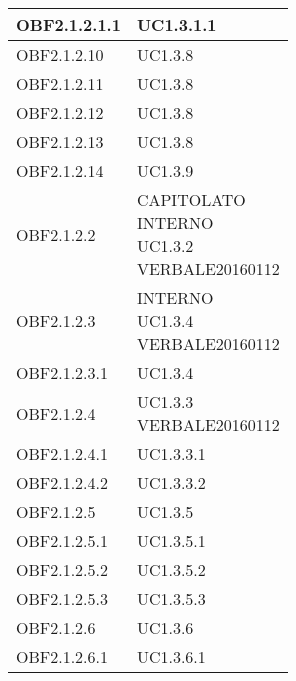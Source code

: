 \documentclass{scalatekids-article}
\begin{document}
\begin{longtable}[H]{|p{5.5cm}|p{5.5cm}|}
\hline
OBF2.1.2.1.1 & \multiLineCell[t]{UC1.3.1.1\\}\\
\hline
OBF2.1.2.10 & \multiLineCell[t]{UC1.3.8\\}\\
\hline
OBF2.1.2.11 & \multiLineCell[t]{UC1.3.8\\}\\
\hline
OBF2.1.2.12 & \multiLineCell[t]{UC1.3.8\\}\\
\hline
OBF2.1.2.13 & \multiLineCell[t]{UC1.3.8\\}\\
\hline
OBF2.1.2.14 & \multiLineCell[t]{UC1.3.9\\}\\
\hline
OBF2.1.2.2 & \multiLineCell[t]{CAPITOLATO\\INTERNO\\UC1.3.2\\VERBALE20160112\\}\\
\hline
OBF2.1.2.3 & \multiLineCell[t]{INTERNO\\UC1.3.4\\VERBALE20160112\\}\\
\hline
OBF2.1.2.3.1 & \multiLineCell[t]{UC1.3.4\\}\\
\hline
OBF2.1.2.4 & \multiLineCell[t]{UC1.3.3\\VERBALE20160112\\}\\
\hline
OBF2.1.2.4.1 & \multiLineCell[t]{UC1.3.3.1\\}\\
\hline
OBF2.1.2.4.2 & \multiLineCell[t]{UC1.3.3.2\\}\\
\hline
OBF2.1.2.5 & \multiLineCell[t]{UC1.3.5\\}\\
\hline
OBF2.1.2.5.1 & \multiLineCell[t]{UC1.3.5.1\\}\\
\hline
OBF2.1.2.5.2 & \multiLineCell[t]{UC1.3.5.2\\}\\
\hline
OBF2.1.2.5.3 & \multiLineCell[t]{UC1.3.5.3\\}\\
\hline
OBF2.1.2.6 & \multiLineCell[t]{UC1.3.6\\}\\
\hline
OBF2.1.2.6.1 & \multiLineCell[t]{UC1.3.6.1\\}\\

\end{longtable}
\end{document}
